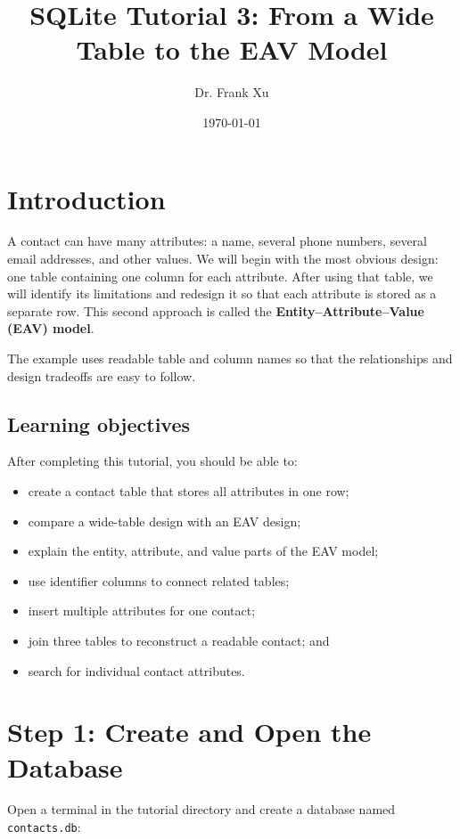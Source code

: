 \documentclass[11pt]{article}
\title{SQLite Tutorial 3: From a Wide Table to the EAV Model}
\author{Dr. Frank Xu}
\date{\today}
\begin{document}
\maketitle

\section*{Introduction}

A contact can have many attributes: a name, several phone numbers, several email
addresses, and other values. We will begin with the most obvious design: one
table containing one column for each attribute. After using that table, we will
identify its limitations and redesign it so that each attribute is stored as a
separate row. This second approach is called the
\textbf{Entity--Attribute--Value (EAV) model}.

The example uses readable table and column names so that the relationships and
design tradeoffs are easy to follow.

\subsection*{Learning objectives}

After completing this tutorial, you should be able to:

\begin{itemize}
    \item create a contact table that stores all attributes in one row;
    \item compare a wide-table design with an EAV design;
    \item explain the entity, attribute, and value parts of the EAV model;
    \item use identifier columns to connect related tables;
    \item insert multiple attributes for one contact;
    \item join three tables to reconstruct a readable contact; and
    \item search for individual contact attributes.
\end{itemize}

\section*{Step 1: Create and Open the Database}

Open a terminal in the tutorial directory and create a database named
\texttt{contacts.db}:
\end{document}
